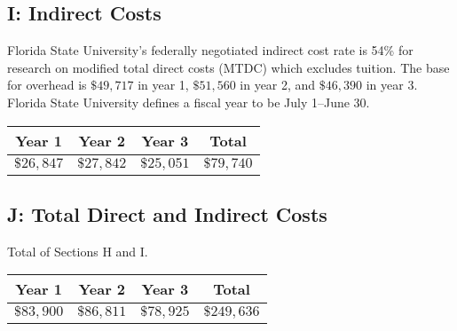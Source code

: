 \documentclass[11pt]{article}
\begin{document}
\subsection*{I: Indirect Costs}
Florida State University's federally negotiated indirect cost rate is
54\% for research on modified total direct costs (MTDC) which excludes
tuition.  The base for overhead is $\$49,717$ in year 1, $\$51,560$ in
year 2, and $\$46,390$ in year 3.  Florida State University defines a
fiscal year to be July 1--June 30.
\begin{center}
  \begin{tabular}{|c|c|c|c|}
    \hline
    Year 1 & Year 2 & Year 3 & Total \\
    \hline
    $\$26,847$ & $\$27,842$ & $\$25,051$ & $\$79,740$ \\
    \hline
  \end{tabular}
\end{center}


\subsection*{J: Total Direct and Indirect Costs}
Total of Sections H and I.
\begin{center}
  \begin{tabular}{|c|c|c|c|}
    \hline
    Year 1 & Year 2 & Year 3 & Total \\
    \hline
    $\$83,900$ & $\$86,811$ & $\$78,925$ & $\$249,636$ \\
    \hline
  \end{tabular}
\end{center}
\end{document}

